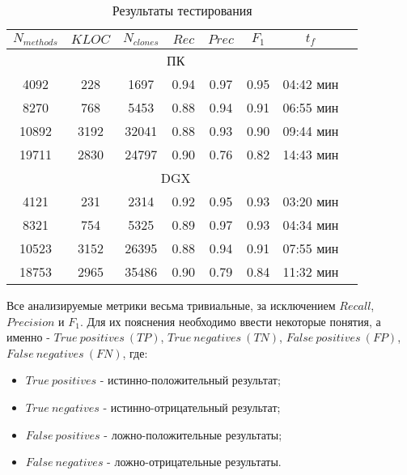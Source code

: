 \begin{table}[H]
\centering
\captionsetup{skip=5pt}
\caption{Результаты тестирования}
\label{testing}
\begin{tabular}{|c|c|c|c|c|c|c|c|}
\hline
\(N_{methods}\) & \(KLOC\) & \(N_{clones}\) & \(Rec\)  & \(Prec\) & \(F_1\) & \(t_f\)        \\ \hline
\multicolumn{7}{|c|}{ПК}										   		    			   \\ \hline
4092			& 228	   & 1697			& 0.94	   & 0.97 	  & 0.95 	& 04:42 мин	   \\ \hline
8270			& 768  	   & 5453    		& 0.88 	   & 0.94 	  & 0.91 	& 06:55 мин	   \\ \hline
10892			& 3192 	   & 32041   		& 0.88 	   & 0.93 	  & 0.90 	& 09:44 мин 	   \\ \hline
19711    		& 2830 	   & 24797   		& 0.90 	   & 0.76 	  & 0.82 	& 14:43 мин 	   \\ \hline
\multicolumn{7}{|c|}{DGX}										   		      		   \\ \hline
4121			& 231	   & 2314    		& 0.92 	   & 0.95 	  & 0.93 	& 03:20 мин 	   \\ \hline
8321     		& 754  	   & 5325    		& 0.89 	   & 0.97 	  & 0.93 	& 04:34 мин 	   \\ \hline
10523    		& 3152 	   & 26395   		& 0.88 	   & 0.94 	  & 0.91 	& 07:55 мин 	   \\ \hline
18753    		& 2965 	   & 35486   		& 0.90 	   & 0.79 	  & 0.84 	& 11:32 мин 	   \\ \hline
\end{tabular}
\end{table}

Все анализируемые метрики весьма тривиальные, за исключением \(Recall\), \(Precision\) и \(F_1\). Для их пояснения необходимо ввести некоторые понятия, а именно - \(True\ positives\ (TP)\), \(True\ negatives\ (TN)\), \(False\ positives\ (FP)\), \(False\ negatives\ (FN)\), где:

\begin{itemize}
\setlength\itemsep{0mm}
\item \(True\ positives\) - истинно-положительный результат;
\item \(True\ negatives\) -  истинно-отрицательный результат;
\item \(False\ positives\) - ложно-положительные результаты;
\item \(False\ negatives\) - ложно-отрицательные результаты.
\end{itemize}

